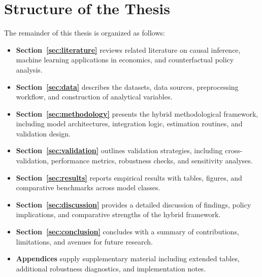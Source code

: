 \section{Structure of the Thesis}\label{sec:structure}
The remainder of this thesis is organized as follows:
\begin{itemize}
  \item \textbf{Section~\ref{sec:literature}} reviews related literature on causal inference, machine learning applications in economics, and counterfactual policy analysis.
  \item \textbf{Section~\ref{sec:data}} describes the datasets, data sources, preprocessing workflow, and construction of analytical variables.
  \item \textbf{Section~\ref{sec:methodology}} presents the hybrid methodological framework, including model architectures, integration logic, estimation routines, and validation design.
  \item \textbf{Section~\ref{sec:validation}} outlines validation strategies, including cross-validation, performance metrics, robustness checks, and sensitivity analyses.
  \item \textbf{Section~\ref{sec:results}} reports empirical results with tables, figures, and comparative benchmarks across model classes.
  \item \textbf{Section~\ref{sec:discussion}} provides a detailed discussion of findings, policy implications, and comparative strengths of the hybrid framework.
  \item \textbf{Section~\ref{sec:conclusion}} concludes with a summary of contributions, limitations, and avenues for future research.
  \item \textbf{Appendices} supply supplementary material including extended tables, additional robustness diagnostics, and implementation notes.
\end{itemize}

